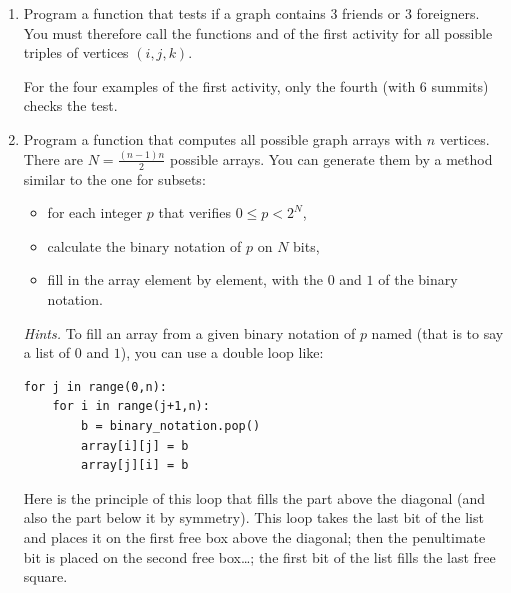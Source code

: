 \documentclass[11pt,class=report,crop=false]{standalone}
\begin{document}
\begin{activite}[Ramsey's theorem for $n=6$]


\begin{enumerate}
  \item Program a function  that tests if a graph contains $3$ friends or $3$ foreigners. You must therefore call the functions  and  of the first activity for all possible triples of vertices $(i,j,k)$.
 
 For the four examples of the first activity, only the fourth (with $6$ summits) checks the test.
  
  \item Program a function  that computes all possible graph arrays with $n$ vertices. There are $N = \frac{(n-1)n}{2}$ possible arrays. You can generate them by a method similar to the one for subsets:
  \begin{itemize}
    \item for each integer $p$ that verifies $0 \le p < 2^N$,
    \item calculate the binary notation of $p$ on $N$ bits,
    \item fill in the array element by element, with the $0$ and $1$ of the binary notation.
  \end{itemize}


\emph{Hints.}
To fill an array from a given binary notation of $p$ named  (that is to say a list of $0$ and $1$), you can use a double loop like:

\begin{lstlisting}
for j in range(0,n):
    for i in range(j+1,n):
        b = binary_notation.pop()
        array[i][j] = b
        array[j][i] = b
\end{lstlisting}
  
Here is the principle of this loop that fills the part above the diagonal (and also the part below it by symmetry).
This loop takes the last bit of the list and places it on the first free box above the diagonal; then the penultimate bit is placed on the second free box\ldots; the first bit of the list fills the last free square.


  

\end{enumerate}
\end{activite}
\end{document}
